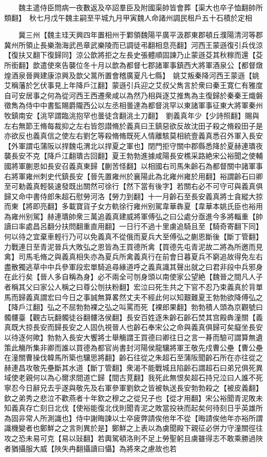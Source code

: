 　　魏主遣侍臣問病一夜數返及卒詔羣臣及附國渠帥皆會葬【渠大也卒子恤翻帥所類翻】　秋七月戊午魏主嗣至平城九月甲寅魏人命諸州調民租戶五十石積於定相

　　冀三州【魏主珪天興四年置相州于鄴領魏陽平廣平汲郡東郡頓丘濮陽清河等郡冀州所領止長樂渤海武邑章武樂陵而已調徒弔翻相息亮翻】河西王蒙遜復引兵伐涼【復扶又翻下復歸同】涼公歆將拒之左長史張體順固諫乃止蒙遜芟其秋稼而還【芟所銜翻】歆遣使來告襲位冬十月以歆為都督七郡諸軍事鎮西大將軍酒泉公【都督燉煌酒泉晉興建康涼興及歆父暠所置會稽廣夏凡七縣】　姚艾叛秦降河西王蒙遜【姚艾稱藩於乞伏事見上年降戶江翻】蒙遜引兵迎之艾叔父雋言於衆曰秦王寛仁有雅度自可安居事之何為從河西王西遷衆咸以為然乃相與逐艾推雋為主復歸於秦秦王熾磐徵雋為侍中中書監賜爵隴西公以左丞相曇達為都督洮罕以東諸軍事征東大將軍秦州牧鎮南安【洮罕謂臨洮抱罕也曇徒含翻洮土刀翻】　劉義真年少【少詩照翻】賜與左右無節王脩每裁抑之左右皆怨譛脩於義真曰王鎮惡欲反故沈田子殺之脩殺田子是亦欲反也義真信之使左右劉乞等殺脩脩既死人情離駭莫相統壹義真悉召外軍入長安【外軍謂屯蒲阪以捍魏屯渭北以捍夏之軍也】閉門拒守關中郡縣悉降於夏赫連璝夜襲長安不克【降戶江翻璝古回翻】夏王勃勃進據咸陽長安樵采路絶宋公裕聞之使輔國將軍蒯恩如長安召義真東歸【蒯苦怪翻】以相國右司馬朱齡石為都督關中諸軍事右將軍雍州刺史代鎮長安【晉先置雍州於襄陽此為北雍州雍於用翻】裕謂齡石曰卿至可勅義真輕裝速發既出關然可徐行【然下當有後字】若關右必不可守可與義真俱歸又命中書侍郎朱超石慰勞河洛【勞力到翻】十一月齡石至長安義真將士貪縱大掠而東【將即亮翻】多載寶貨子女方軌徐行雍州别駕韋華犇夏【韋華本姚氏臣也裕用為雍州别駕】赫連璝帥衆三萬追義真建威將軍傅弘之曰公處分亟進今多將輜重【帥讀曰率處昌呂翻分扶問翻重直用翻】一日行不過十里虜追騎且至【騎奇寄翻下同】何以待之宜棄車輕行乃可以免義真不從俄而夏兵大至傅弘之蒯恩斷後【斷丁管翻】力戰連日至青泥晉兵大敗弘之恩皆為王買德所禽【買德先屯青泥故二將為所邀而見禽】司馬毛脩之與義真相失亦為夏兵所禽義真行在前會日暮夏兵不窮追故得免左右盡散獨逃草中中兵參軍段宏單騎追尋緣道呼之義真識其聲出就之曰君非段中兵邪身在此行矣【晉人多自稱為身】必不兩全可刎身頭以南使家公望絶【魏晉之間凡人子者稱其父曰家公人稱之曰尊公刎扶粉翻】宏泣曰死生共之下官不忍乃束義真於背單馬而歸義真謂宏曰今日之事誠無算畧然丈夫不經此何以知艱難夏王勃勃欲降傅弘之【降戶江翻】弘之不屈勃勃裸之弘之叫罵而死【裸郎果翻】勃勃積人頭為京觀號曰髑髏臺【觀古玩翻髑徒谷翻髏洛侯翻】長安百姓逐朱齡石齡石焚其宫殿犇潼關【義真既大掠長安而歸長安之人固仇視晉人也齡石奉宋公之命與義真俱歸可矣癡坐長安以待逐何歟】勃勃入長安大饗將士舉觴謂王買德曰卿往日之言一朞而驗可謂算無遺策此觴所集非卿而誰以買德為都官尚書封河陽侯龍驤將軍王敬先戍曹公壘【曹公壘在潼關曹操伐韓馬所築也驤思將翻】齡石往從之朱超石至蒲阪聞齡石所在亦往從之赫連昌攻敬先壘斷其水道【斷丁管翻】衆渴不能戰城且陷齡石謂超石曰弟兄俱死異域使老親何以為心爾求間道亡歸【間古莧翻】我死此無恨矣超石持兄泣曰人誰不死寧忍今日辭兄去乎遂與敬先及右軍參軍劉欽之皆被執送長安勃勃殺之【被皮義翻】欽之弟秀之悲泣不歡燕者十年欽之穆之之從兄子也【從才用翻】宋公裕聞青泥敗未知義真存亡刻日北伐【使裕能復北伐則聞青泥之敗當投袂而起矣何待刻日乎英雄所為固非常人所測識也】侍中謝晦諫以士卒疲弊請俟他年不從【晦請俟他年亦裕所謂識機變者也鄭鮮之之言則異於是】鄭鮮之上表以為虜聞殿下親征必併力守潼關徑往攻之恐未易可克【易以䜴翻】若輿駕頓洛則不足上勞聖躬且虜雖得志不敢乘勝過陜者猶攝服大威【陜失冉翻攝讀曰懾】為將來之慮故也若
